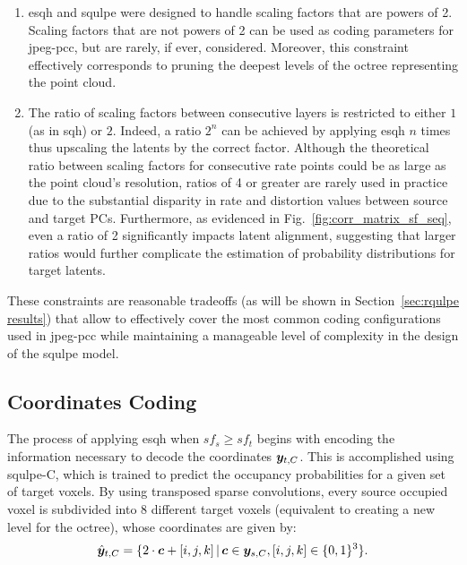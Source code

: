 \begin{enumerate}
\item \gls{esqh} and \gls{squlpe} were designed to handle scaling factors that are powers of 2. Scaling factors that are not powers of 2 can be used as coding parameters for \gls{jpeg-pcc}, but are rarely, if ever, considered.
Moreover, this constraint effectively corresponds to pruning the deepest levels of the octree representing the point cloud.
\item The ratio of scaling factors between consecutive layers is restricted to either $1$ (as in \gls{sqh}) or $2$. Indeed, a ratio $2^n$ can be achieved by applying \gls{esqh} $n$ times thus upscaling the latents by the correct factor. Although the theoretical ratio between scaling factors for consecutive rate points could be as large as the point cloud's resolution, ratios of 4 or greater are rarely used in practice due to the substantial disparity in rate and distortion values between source and target PCs. Furthermore, as evidenced in Fig.~\ref{fig:corr_matrix_sf_seq}, even a ratio of 2 significantly impacts latent alignment, suggesting that larger ratios would further complicate the estimation of probability distributions for target latents.

\end{enumerate}

These constraints are reasonable tradeoffs (as will be shown in Section~\ref{sec:rqulpe results}) that allow to effectively cover the most common coding configurations used in \gls{jpeg-pcc} while maintaining a manageable level of complexity in the design of the \gls{squlpe} model.

\subsection{Coordinates Coding}
The process of applying \gls{esqh} when $sf_s \geq sf_t$ begins with encoding the information necessary to decode the coordinates $\y_{t,C}$.
This is accomplished using \gls{squlpe}-C, which is trained to predict the occupancy probabilities for a given set of target voxels. 
By using transposed sparse convolutions, every source occupied voxel is subdivided into 8 different target voxels (equivalent to creating a new level for the octree), whose coordinates are given by:
\begin{equation}
\hat{\y}_{t, C} = \{2 \cdot \C + [i, j, k] \, | \, \C \in \y_{s, C}, [i, j, k] \in \{0, 1\}^3\}.
\end{equation}

